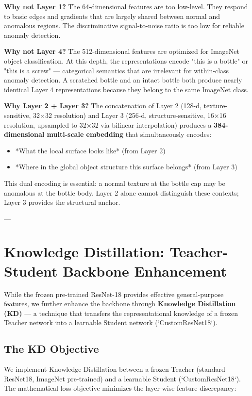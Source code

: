 \documentclass[12pt,a4paper,oneside]{report}
\begin{document}
\textbf{Why not Layer 1?} The 64-dimensional features are too low-level. They respond to basic edges and gradients that are largely shared between normal and anomalous regions. The discriminative signal-to-noise ratio is too low for reliable anomaly detection.

\textbf{Why not Layer 4?} The 512-dimensional features are optimized for ImageNet object classification. At this depth, the representations encode "this is a bottle" or "this is a screw" --- categorical semantics that are irrelevant for within-class anomaly detection. A scratched bottle and an intact bottle both produce nearly identical Layer 4 representations because they belong to the same ImageNet class.

\textbf{Why Layer 2 + Layer 3?} The concatenation of Layer 2 (128-d, texture-sensitive, 32×32 resolution) and Layer 3 (256-d, structure-sensitive, 16×16 resolution, upsampled to 32×32 via bilinear interpolation) produces a \textbf{384-dimensional multi-scale embedding} that simultaneously encodes:
\begin{itemize}
  \item *What the local surface looks like* (from Layer 2)
  \item *Where in the global object structure this surface belongs* (from Layer 3)
\end{itemize}
This dual encoding is essential: a normal texture at the bottle cap may be anomalous at the bottle body. Layer 2 alone cannot distinguish these contexts; Layer 3 provides the structural anchor.

---

\section{Knowledge Distillation: Teacher-Student Backbone Enhancement}

While the frozen pre-trained ResNet-18 provides effective general-purpose features, we further enhance the backbone through \textbf{Knowledge Distillation (KD)} --- a technique that transfers the representational knowledge of a frozen Teacher network into a learnable Student network (`CustomResNet18`).

\subsection{The KD Objective}

We implement Knowledge Distillation between a frozen Teacher (standard ResNet18, ImageNet pre-trained) and a learnable Student (`CustomResNet18`). The mathematical loss objective minimizes the layer-wise feature discrepancy:
\end{document}
